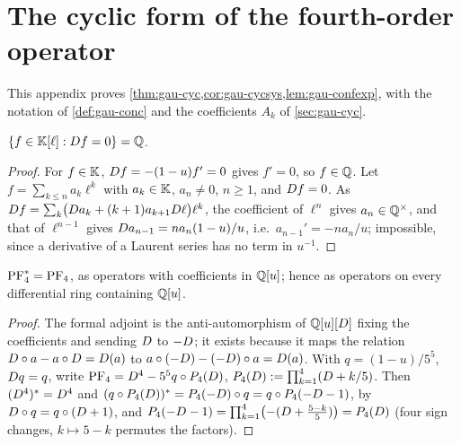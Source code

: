\section{The cyclic form of the fourth-order operator}
\label{sec:gau-cycproof}

This appendix proves \cref{thm:gau-cyc,cor:gau-cycsys,lem:gau-confexp}, with the notation of \cref{def:gau-conc} and the coefficients $A_k$ of \cref{sec:gau-cyc}.

\begin{lem}
\label{lem:gau-const}
$\{f\in\mathbb{K}[\ell]:D f=0\}=\mathbb{Q}$.
\end{lem}

\begin{proof}
For $f\in\mathbb{K}$, $D f=-(1-u)f'=0$ gives $f'=0$, so $f\in\mathbb{Q}$. Let $f=\sum_{k\leq n}a_k\ell^k$ with $a_k\in\mathbb{K}$, $a_n\neq0$, $n\geq1$, and $D f=0$. As $D f=\sum_k\bigl(D a_k+(k+1)a_{k+1}D\ell\bigr)\ell^k$, the coefficient of $\ell^n$ gives $a_n\in\mathbb{Q}^\times$, and that of $\ell^{n-1}$ gives $D a_{n-1}=na_n(1-u)/u$, i.e.\ $a_{n-1}'=-na_n/u$; impossible, since a derivative of a Laurent series has no term in $u^{-1}$.
\end{proof}

\begin{lem}
\label{lem:gau-adj}
$\mathrm{PF}_{4}^*=\mathrm{PF}_{4}$, as operators with coefficients in $\mathbb{Q}[u]$; hence as operators on every differential ring containing $\mathbb{Q}[u]$.
\end{lem}

\begin{proof}
The formal adjoint is the anti-automorphism of $\mathbb{Q}[u][D]$ fixing the coefficients and sending $D$ to $-D$; it exists because it maps the relation $D\circ a-a\circ D=D(a)$ to $a\circ(-D)-(-D)\circ a=D(a)$. With $q=(1-u)/5^5$, $D q=q$, write $\mathrm{PF}_{4}=D^4-5^5q\circ P_4(D)$, $P_4(D):=\prod_{k=1}^4(D+k/5)$. Then $(D^4)^*=D^4$ and $(q\circ P_4(D))^*=P_4(-D)\circ q=q\circ P_4(-D-1)$, by $D\circ q=q\circ(D+1)$, and $P_4(-D-1)=\prod_{k=1}^4\bigl(-(D+\frac{5-k}5)\bigr)=P_4(D)$ (four sign changes, $k\mapsto5-k$ permutes the factors).
\end{proof}

